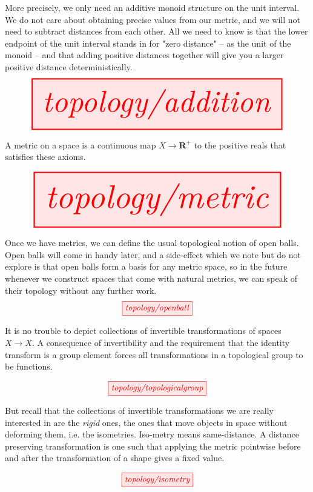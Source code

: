 \begin{myboxR}
\begin{defn}[Addition]\label{def:addition}
More precisely, we only need an additive monoid structure on the unit interval. We do not care about obtaining precise values from our metric, and we will not need to subtract distances from each other. All we need to know is that the lower endpoint of the unit interval stands in for "zero distance" -- as the unit of the monoid -- and that adding positive distances together will give you a larger positive distance deterministically.
\[\resizebox{\textwidth}{!}{\tikzfig{topology/addition}}\]
\end{defn}
\end{myboxR}

\begin{myboxB}
\begin{defn}[Metric]\label{def:metric}
A metric on a space is a continuous map $X \rightarrow \mathbf{R}^+$ to the positive reals that satisfies these axioms.
\end{defn}
\[\resizebox{\textwidth}{!}{\tikzfig{topology/metric}}\]
\end{myboxB}

\begin{myboxR}
\begin{defn}\label{def:openball}
Once we have metrics, we can define the usual topological notion of open balls. Open balls will come in handy later, and a side-effect which we note but do not explore is that open balls form a basis for any metric space, so in the future whenever we construct spaces that come with natural metrics, we can speak of their topology without any further work.
\[\tikzfig{topology/openball}\]
\end{defn}
\end{myboxR}

\begin{myboxB}
\begin{defn}\label{def:topgrp} 
It is no trouble to depict collections of invertible transformations of spaces $X \rightarrow X$. A consequence of invertibility and the requirement that the identity transform is a group element forces all transformations in a topological group to be functions.
\end{defn}
\[\tikzfig{topology/topologicalgroup}\]
\end{myboxB}

\begin{myboxR}
\begin{defn}[Isometry]\label{def:isometry}
But recall that the collections of invertible transformations we are really interested in are the \emph{rigid} ones, the ones that move objects in space without deforming them, i.e. the isometries. Iso-metry means same-distance. A distance preserving transformation is one such that applying the metric pointwise before and after the transformation of a shape gives a fixed value.
\end{defn}
\[\tikzfig{topology/isometry}\]
\end{myboxR}

